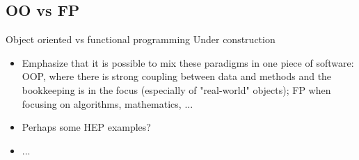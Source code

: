 \subsection{OO vs FP}

\begin{frame}{Object oriented vs functional programming}
	Under construction
	\begin{itemize}
		\item Emphasize that it is possible to mix these paradigms in one piece of software: OOP, where there is strong coupling between data and methods and the bookkeeping is in the focus (especially of "real-world" objects); FP when focusing on algorithms, mathematics, ...
		\item Perhaps some HEP examples?
		\item ...
	\end{itemize}
\end{frame}
	